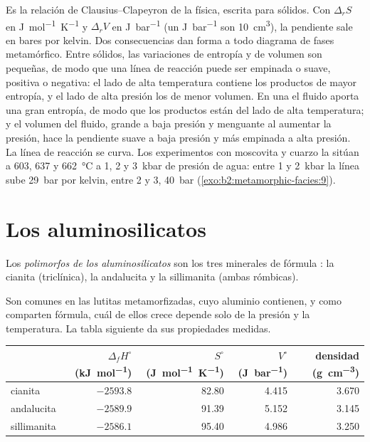 Es la relación de Clausius--Clapeyron de la física, escrita para sólidos. Con
$\Delta_r S$ en \unit{J.mol^{-1}.K^{-1}} y $\Delta_r V$ en \unit{J.bar^{-1}} (un
\unit{J.bar^{-1}} son \qty{10}{cm^3}), la pendiente sale en bares por kelvin. Dos
consecuencias dan forma a todo diagrama de fases metamórfico. Entre sólidos, las variaciones de entropía y de volumen
son pequeñas, de modo que una línea de reacción puede ser empinada o suave, positiva o
negativa: el lado de alta temperatura contiene los productos de mayor entropía, y el
lado de alta presión los de menor volumen. En una  el fluido
aporta una gran entropía, de modo que los productos están del lado de alta temperatura; y el volumen
del fluido, grande a baja presión y menguante al aumentar la presión, hace la pendiente
suave a baja presión y más empinada a alta presión. La línea de reacción se curva.
Los experimentos con moscovita y cuarzo la sitúan a 603, 637 y \qty{662}{\celsius} a 1,
2 y \qty{3}{kbar} de presión de agua: entre 1 y \qty{2}{kbar} la línea sube
\qty{29}{bar} por kelvin, entre 2 y 3, \qty{40}{bar} (\cref{exo:b2:metamorphic-facies:9}).

\section{Los aluminosilicatos}\label{sec:b2:metamorphic-facies:al2sio5}

\begin{definition}\label{def:b2:metamorphic-facies:al2sio5}
Los \emph{polimorfos de los aluminosilicatos} son los tres
minerales de fórmula : la cianita (triclínica), la andalucita y la sillimanita (ambas
rómbicas).
\end{definition}

Son comunes en las lutitas metamorfizadas, cuyo aluminio contienen, y como
comparten fórmula, cuál de ellos crece depende solo de la presión y la temperatura. La tabla
siguiente da sus propiedades medidas.

\begin{center}
\small
\begin{tabular}{@{}lrrrr@{}}
\hline
 & $\Delta_f H^\circ$ (\unit{kJ.mol^{-1}}) & $S^\circ$ (\unit{J.mol^{-1}.K^{-1}}) & $V^\circ$ (\unit{J.bar^{-1}}) & densidad (\unit{g.cm^{-3}})\\
\hline
cianita & $-2593.8$ & 82.80 & 4.415 & 3.670\\
andalucita & $-2589.9$ & 91.39 & 5.152 & 3.145\\
sillimanita & $-2586.1$ & 95.40 & 4.986 & 3.250\\
\hline
\end{tabular}
\par{}
\end{center}


